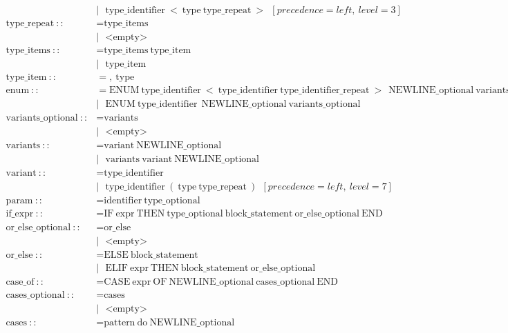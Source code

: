 \documentclass{article}
\begin{document}
\begin{align*}
    &|\ \ \ \text{type\_identifier}\ <\ \text{type}\ \text{type\_repeat}\ >\ \ [precedence=left,\ level=3]\\
  \text{type\_repeat}\ ::&= \text{type\_items}\\
    &|\ \ \ \text{<empty>}\\
  \text{type\_items}\ ::&= \text{type\_items}\ \text{type\_item}\\
    &|\ \ \ \text{type\_item}\\
  \text{type\_item}\ ::&= ,\ \text{type}\\
  \text{enum}\ ::&= \text{ENUM}\ \text{type\_identifier}\ <\ \text{type\_identifier}\ \text{type\_identifier\_repeat}\ >\ {\ \text{NEWLINE\_optional}\ \text{variants\_optional}\ }\\
    &|\ \ \ \text{ENUM}\ \text{type\_identifier}\ {\ \text{NEWLINE\_optional}\ \text{variants\_optional}\ }\\
  \text{variants\_optional}\ ::&= \text{variants}\\
    &|\ \ \ \text{<empty>}\\
  \text{variants}\ ::&= \text{variant}\ \text{NEWLINE\_optional}\\
    &|\ \ \ \text{variants}\ \text{variant}\ \text{NEWLINE\_optional}\\
  \text{variant}\ ::&= \text{type\_identifier}\\
    &|\ \ \ \text{type\_identifier}\ (\ \text{type}\ \text{type\_repeat}\ )\ \ [precedence=left,\ level=7]\\
  \text{param}\ ::&= \text{identifier}\ \text{type\_optional}\\
  \text{if\_expr}\ ::&= \text{IF}\ \text{expr}\ \text{THEN}\ \text{type\_optional}\ \text{block\_statement}\ \text{or\_else\_optional}\ \text{END}\\
  \text{or\_else\_optional}\ ::&= \text{or\_else}\\
    &|\ \ \ \text{<empty>}\\
  \text{or\_else}\ ::&= \text{ELSE}\ \text{block\_statement}\\
    &|\ \ \ \text{ELIF}\ \text{expr}\ \text{THEN}\ \text{block\_statement}\ \text{or\_else\_optional}\\
  \text{case\_of}\ ::&= \text{CASE}\ \text{expr}\ \text{OF}\ \text{NEWLINE\_optional}\ \text{cases\_optional}\ \text{END}\\
  \text{cases\_optional}\ ::&= \text{cases}\\
    &|\ \ \ \text{<empty>}\\
  \text{cases}\ ::&= \text{pattern}\ \text{do}\ \text{NEWLINE\_optional}\\

\end{align*}
\end{document}
